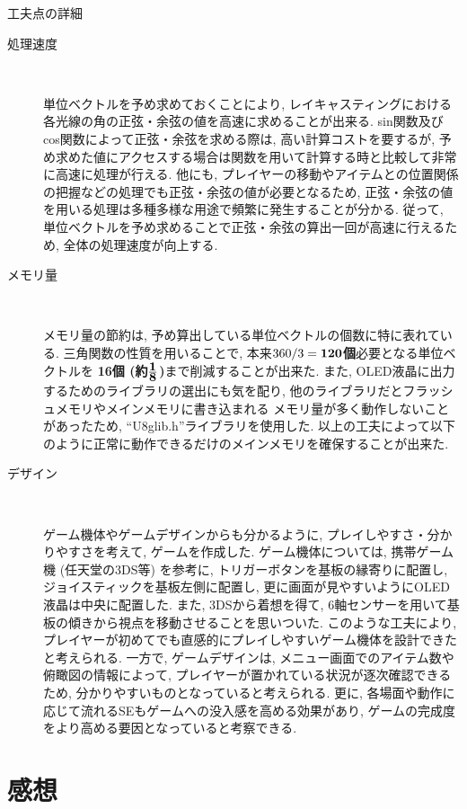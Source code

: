 \documentclass[10pt]{jsarticle}
\newcommand{\bm}[1]{{\mbox{\boldmath $#1$}}}
\begin{document}
\begin{itembox}[l]{工夫点の詳細}
\begin{description}
\item[処理速度]　\par
単位ベクトルを予め求めておくことにより, レイキャスティングにおける各光線の角の正弦・余弦の値を高速に求めることが出来る.
sin関数及びcos関数によって正弦・余弦を求める際は, 高い計算コストを要するが,
予め求めた値にアクセスする場合は関数を用いて計算する時と比較して非常に高速に処理が行える.
他にも, プレイヤーの移動やアイテムとの位置関係の把握などの処理でも正弦・余弦の値が必要となるため,
正弦・余弦の値を用いる処理は多種多様な用途で頻繁に発生することが分かる.
従って, 単位ベクトルを予め求めることで正弦・余弦の算出一回が高速に行えるため, 全体の処理速度が向上する.

\item[メモリ量]　\par
メモリ量の節約は, 予め算出している単位ベクトルの個数に特に表れている.
三角関数の性質を用いることで, 本来$360/3=\bm{120}$\textbf{個}必要となる単位ベクトルを
\textbf{16個 (約$\frac{\bm{1}}{\bm{8}}$)}まで削減することが出来た.
また, OLED液晶に出力するためのライブラリの選出にも気を配り, 他のライブラリだとフラッシュメモリやメインメモリに書き込まれる
メモリ量が多く動作しないことがあったため, ``U8glib.h''ライブラリを使用した.
以上の工夫によって以下のように正常に動作できるだけのメインメモリを確保することが出来た.

\item[デザイン]　\par
ゲーム機体やゲームデザインからも分かるように, プレイしやすさ・分かりやすさを考えて, ゲームを作成した.
ゲーム機体については, 携帯ゲーム機 (任天堂の3DS等) を参考に, トリガーボタンを基板の縁寄りに配置し, 
ジョイスティックを基板左側に配置し, 更に画面が見やすいようにOLED液晶は中央に配置した.
また, 3DSから着想を得て, 6軸センサーを用いて基板の傾きから視点を移動させることを思いついた.
このような工夫により, プレイヤーが初めてでも直感的にプレイしやすいゲーム機体を設計できたと考えられる.
一方で, ゲームデザインは, メニュー画面でのアイテム数や俯瞰図の情報によって, 
プレイヤーが置かれている状況が逐次確認できるため, 分かりやすいものとなっていると考えられる.
更に, 各場面や動作に応じて流れるSEもゲームへの没入感を高める効果があり, 
ゲームの完成度をより高める要因となっていると考察できる.

\end{description}
\end{itembox}

\section{感想}
\end{document}
